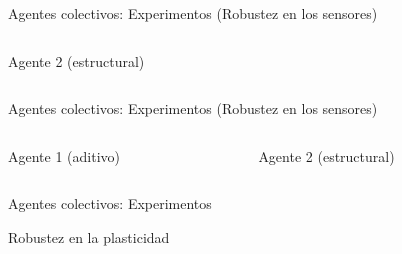\documentclass[aspectratio=169]{beamer}
\begin{document}
\begin{frame}{Agentes colectivos: Experimentos (Robustez en los sensores)}
\begin{columns}
\begin{column}{0.5\textwidth}
\begin{block}{Agente 2 (estructural)}
      \end{block}
    \end{column}
  \end{columns}
\end{frame}

\begin{frame}{Agentes colectivos: Experimentos (Robustez en los sensores)}
  \begin{columns}
    \begin{column}{0.47\textwidth}
      \begin{block}{Agente 1 (aditivo)}

    \end{block}
    \end{column}
    \begin{column}{0.5\textwidth}
      \begin{block}{Agente 2 (estructural)}

      \end{block}
    \end{column}
  \end{columns}
\end{frame}


\begin{frame}{Agentes colectivos: Experimentos}
\begin{block}{Robustez en la plasticidad}

\end{block}
\end{frame}



\end{document}
